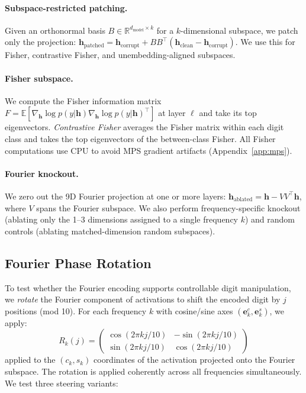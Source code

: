 \paragraph{Subspace-restricted patching.} Given an orthonormal basis $B \in \mathbb{R}^{d_\text{model} \times k}$ for a $k$-dimensional subspace, we patch only the projection: $\mathbf{h}_\text{patched} = \mathbf{h}_\text{corrupt} + B B^\top (\mathbf{h}_\text{clean} - \mathbf{h}_\text{corrupt})$. We use this for Fisher, contrastive Fisher, and unembedding-aligned subspaces.

\paragraph{Fisher subspace.} We compute the Fisher information matrix $F = \mathbb{E}[\nabla_\mathbf{h} \log p(y|\mathbf{h}) \nabla_\mathbf{h} \log p(y|\mathbf{h})^\top]$ at layer $\ell$ and take its top eigenvectors. \emph{Contrastive Fisher} averages the Fisher matrix within each digit class and takes the top eigenvectors of the between-class Fisher. All Fisher computations use CPU to avoid MPS gradient artifacts (Appendix~\ref{app:mps}).

\paragraph{Fourier knockout.} We zero out the 9D Fourier projection at one or more layers: $\mathbf{h}_\text{ablated} = \mathbf{h} - V V^\top \mathbf{h}$, where $V$ spans the Fourier subspace. We also perform frequency-specific knockout (ablating only the 1--3 dimensions assigned to a single frequency $k$) and random controls (ablating matched-dimension random subspaces).

\subsection{Fourier Phase Rotation}
\label{sec:method_rotation}

To test whether the Fourier encoding supports controllable digit manipulation, we \emph{rotate} the Fourier component of activations to shift the encoded digit by $j$ positions (mod 10). For each frequency $k$ with cosine/sine axes $(\mathbf{e}^c_k, \mathbf{e}^s_k)$, we apply:
\begin{equation}
    R_k(j) = \begin{pmatrix} \cos(2\pi k j / 10) & -\sin(2\pi k j / 10) \\ \sin(2\pi k j / 10) & \cos(2\pi k j / 10) \end{pmatrix}
\end{equation}
applied to the $(c_k, s_k)$ coordinates of the activation projected onto the Fourier subspace. The rotation is applied coherently across all frequencies simultaneously. We test three steering variants:


